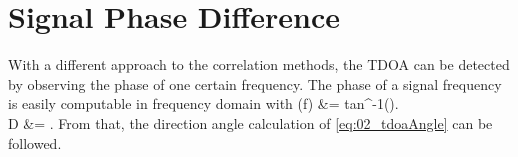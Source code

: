\section{Signal Phase Difference}
\label{sec:02_phase}

With a different approach to the correlation methods, the \ac{TDOA} can be
detected by observing the phase of one certain frequency.
The phase of a signal frequency is easily computable in frequency domain
with
\bal
    \phi(f) &= tan^{-1}().\\
    D &= .
\eal
From that, the direction angle calculation of \cref{eq:02_tdoaAngle} can
be followed.